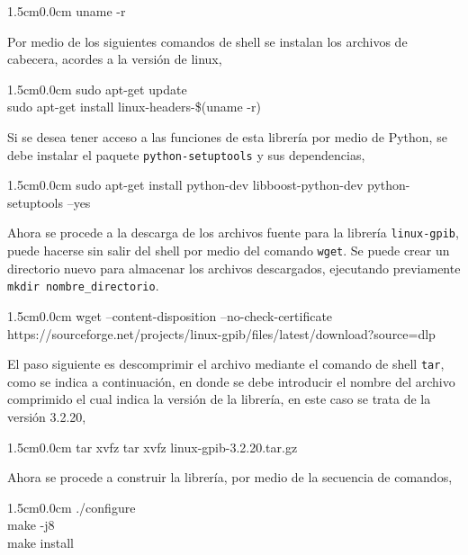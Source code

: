 \documentclass[paper=letter,oneside,fontsize=11pt, parskip=full]{scrartcl}
\newenvironment{code}
	{\begin{adjustwidth}{1.5cm}{0.0cm}\ttfamily}
	{\end{adjustwidth}}
\begin{document}
		\begin{code}
			uname -r
		\end{code}
		
		Por medio de los siguientes comandos de shell se instalan los archivos de cabecera, acordes a la versión de linux,
		
		\begin{code}
			sudo apt-get update		\\
			sudo apt-get install linux-headers-\$(uname -r)
		\end{code}
		
		Si se desea tener acceso a las funciones de esta librería por medio de Python, se debe instalar el paquete \texttt{python-setuptools} y sus dependencias,
		
		\begin{code}		
			sudo apt-get install python-dev libboost-python-dev python-setuptools --yes
		\end{code}
			
		Ahora se procede a la descarga de los archivos fuente para la librería \texttt{linux-gpib}, puede hacerse sin salir del shell por medio del comando \texttt{wget}. Se puede crear un directorio nuevo para almacenar los archivos descargados, ejecutando previamente \texttt{mkdir nombre\_directorio}.
		
		\begin{code}
			wget --content-disposition --no-check-certificate \\
			https://sourceforge.net/projects/linux-gpib/files/latest/download?source=dlp
		\end{code}
		
		El paso siguiente es descomprimir el archivo mediante el comando de shell \texttt{tar}, como se indica a continuación, en donde se debe introducir el nombre del archivo comprimido el cual indica la versión de la librería, en este caso se trata de la versión 3.2.20,

		\begin{code}		
			tar xvfz tar xvfz linux-gpib-3.2.20.tar.gz
		\end{code}
			
		Ahora se procede a construir la librería, por medio de la secuencia de comandos,
		
		\begin{code}		
			./configure \\		
			make -j8 	\\		
			make install
		\end{code}
					
\end{document}
